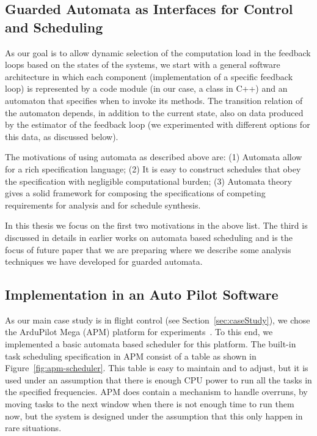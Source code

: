 \documentclass[ twoside, 12pt ]{article}
\begin{document}
\subsection{Guarded Automata as Interfaces for Control and Scheduling}
As our goal is to allow dynamic selection of the computation load in the feedback loops based on the states of the systems, we start with a general software architecture in which each component (implementation of a specific feedback loop) is represented by a code module (in our case, a class in C++) and an automaton that specifies when to invoke its methods. The transition relation of the automaton depends, in addition to the current state, also on data produced by the estimator of the feedback loop (we experimented with different options for this data, as discussed below).

The motivations of using automata as described above are: (1) Automata allow for a rich specification language; (2) It is easy to construct schedules that obey the specification with negligible computational burden; (3) Automata theory gives a solid framework for composing the specifications of competing requirements for analysis and for schedule synthesis. 

In this thesis we focus on the first two motivations in the above list. The third is discussed in details in earlier works on automata based scheduling and is the focus of future paper that we are preparing where we describe some analysis techniques we have developed for guarded automata.   

\subsection{Implementation in an Auto Pilot Software}
As our main case study is in flight control (see Section~\ref{sec:caseStudy}), we chose the ArduPilot Mega (APM) platform for experiments~\cite{APM}. To this end, we implemented a basic automata based scheduler for this platform. The built-in task scheduling specification in APM consist of a table as shown in Figure~\ref{fig:apm-scheduler}. This table is easy to maintain and to adjust, but it is used under an assumption that there is enough CPU power to run all the tasks in the specified frequencies. APM does contain a mechanism to handle overruns, by moving tasks to the next window when there is not enough time to run them now, but the system is designed under the assumption that this only happen in rare situations.
\end{document}
